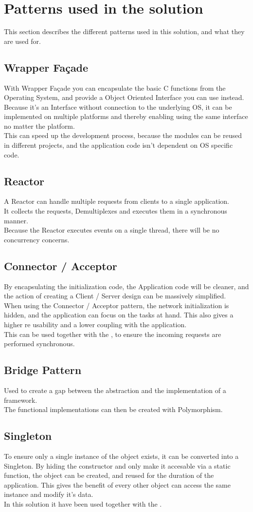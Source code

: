 \documentclass[Main]{subfiles}
\begin{document}
\section{Patterns used in the solution}
This section describes the different patterns used in this solution, and what they are used for.
\subsection{Wrapper Façade}
With Wrapper Façade you can encapsulate the basic C functions from the Operating System, and provide a Object Oriented Interface you can use instead.\\
Because it's an Interface without connection to the underlying OS, it can be implemented on multiple platforms and thereby enabling using the same interface no matter the platform.\\
This can speed up the development process, because the modules can be reused in different projects, and the application code isn't dependent on OS specific code.
\subsection{Reactor}
A Reactor can handle multiple requests from clients to a single application.\\
It collects the requests, Demultiplexes and executes them in a synchronous manner.\\
Because the Reactor executes events on a single thread, there will be no concurrency concerns.
\subsection{Connector / Acceptor}
By encapsulating the initialization code, the Application code will be cleaner, and the action of creating a Client / Server design can be massively simplified.\\
When using the Connector / Acceptor pattern, the network initialization is hidden, and the application can focus on the tasks at hand.
This also gives a higher re usability and a lower coupling with the application.\\
This can be used together with the , to ensure the incoming requests are performed synchronous. 
\subsection{Bridge Pattern}
Used to create a gap between the abstraction and the implementation of a framework.\\
The functional implementations can then be created with Polymorphism.
\subsection{Singleton}
To ensure only a single instance of the object exists, it can be converted into a Singleton.
By hiding the constructor and only make it accesable via a static function, the object can be created, and reused for the duration of the application. This gives the benefit of every other object can access the same instance and modify it's data.\\
In this solution it have been used together with the .
\end{document}
